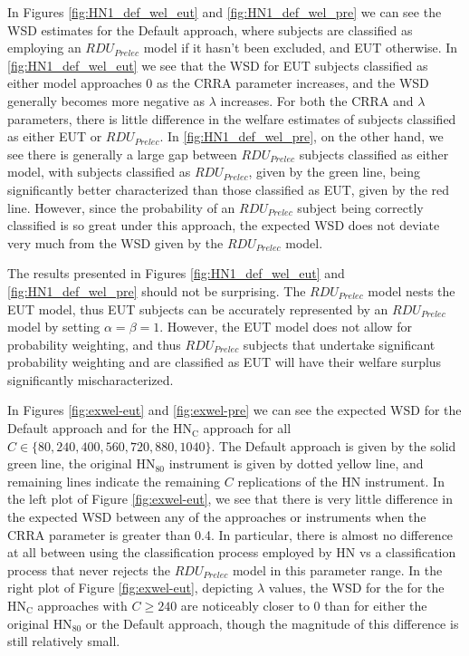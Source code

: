 \documentclass[../main.tex]{subfiles}
\begin{document}
In Figures \ref{fig:HN1_def_wel_eut} and \ref{fig:HN1_def_wel_pre} we can see the WSD estimates for the Default approach, where subjects are classified as employing an $\mathit{RDU_{Prelec}}$ model if it hasn't been excluded, and EUT otherwise.
In \ref{fig:HN1_def_wel_eut} we see that the WSD for EUT subjects classified as either model approaches 0 as the CRRA parameter increases, and the WSD generally becomes more negative as $\lambda$ increases.
For both the CRRA and $\lambda$ parameters, there is little difference in the welfare estimates of subjects classified as either EUT or $\mathit{RDU_{Prelec}}$.
In \ref{fig:HN1_def_wel_pre}, on the other hand, we see there is generally a large gap between $\mathit{RDU_{Prelec}}$ subjects classified as either model, with subjects classified as $\mathit{RDU_{Prelec}}$, given by the green line, being significantly better characterized than those classified as EUT, given by the red line.
However, since the probability of an $\mathit{RDU_{Prelec}}$ subject being correctly classified is so great under this approach, the expected WSD does not deviate very much from the WSD given by the $\mathit{RDU_{Prelec}}$ model.

The results presented in Figures \ref{fig:HN1_def_wel_eut} and \ref{fig:HN1_def_wel_pre} should not be surprising.
The $\mathit{RDU_{Prelec}}$ model nests the EUT model, thus EUT subjects can be accurately represented by an $\mathit{RDU_{Prelec}}$ model by setting $\alpha = \beta = 1$.
However, the EUT model does not allow for probability weighting, and thus $\mathit{RDU_{Prelec}}$ subjects that undertake significant probability weighting and are classified as EUT will have their welfare surplus significantly mischaracterized.

In Figures \ref{fig:exwel-eut} and \ref{fig:exwel-pre} we can see the expected WSD for the Default approach and for the $\text{HN}_\text{C}$ approach for all $C \in \lbrace 80, 240, 400, 560, 720, 880, 1040 \rbrace$.
The Default approach is given by the solid green line, the original $\text{HN}_{80}$ instrument is given by dotted yellow line, and remaining lines indicate the remaining $C$ replications of the HN instrument.
In the left plot of Figure \ref{fig:exwel-eut}, we see that there is very little difference in the expected WSD between any of the approaches or instruments when the CRRA parameter is greater than 0.4.
In particular, there is almost no difference at all between using the classification process employed by HN vs a classification process that never rejects the $\mathit{RDU_{Prelec}}$ model in this parameter range.
In the right plot of Figure \ref{fig:exwel-eut}, depicting $\lambda$ values, the WSD for the for the $\text{HN}_\text{C}$ approaches with $C \geq 240$ are noticeably closer to 0 than for either the original $\text{HN}_{80}$ or the Default approach, though the magnitude of this difference is still relatively small.
\end{document}
